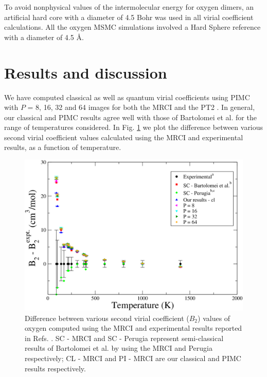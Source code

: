     To avoid nonphysical values of the intermolecular energy for oxygen dimers, an artificial hard core with a diameter of 4.5 Bohr was used in all virial coefficient calculations. All the oxygen MSMC simulations involved a Hard Sphere reference with a diameter of 4.5 \AA.
\section{Results and discussion}
    We have computed classical as well as quantum virial coefficients using PIMC with $P$ = 8, 16, 32 and 64 images for both the MRCI and the PT2 \PESs{}. In general, our classical and PIMC results agree well with those of Bartolomei et al. \cite{Bartolomei2010} for the range of temperatures considered. In Fig. \ref{fig:B2O2AllExpDiffMRCI} we plot the difference between various second virial coefficient values calculated using the MRCI \PESs{} and experimental results, as a function of temperature.
    \begin{figure}[!htbp]
        \centering
        \includegraphics[scale=0.20,keepaspectratio]{Chapter-6/Figures/B2O2AllExpDiffMRCI.png}
        \caption{Difference between various second virial coefficient ($B_2$) values of oxygen computed using the MRCI \PESs{} and experimental results reported in Refs. \cite{Bartolomei2010,Dymond}. SC - MRCI and SC - Perugia represent semi-classical results of Bartolomei et al. \cite{Bartolomei2010} by using the MRCI and Perugia \PESs{} \cite{Aquilanti1999} respectively; CL - MRCI and PI - MRCI are our classical and PIMC results respectively.}
        \label{fig:B2O2AllExpDiffMRCI}
    \end{figure}

